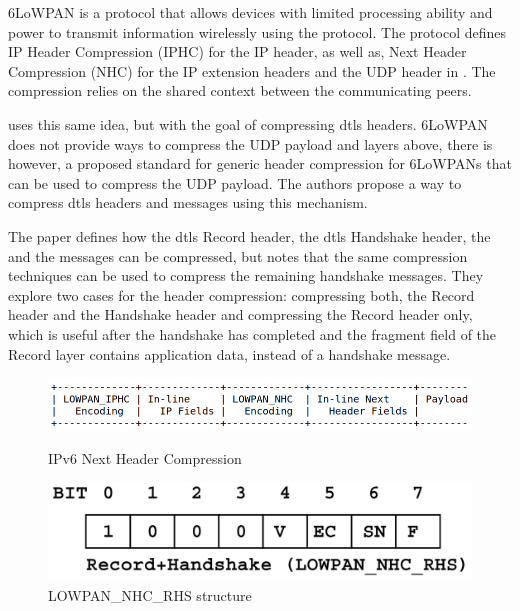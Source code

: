 \documentclass{llncs}
\begin{document}
6LoWPAN\cite{RFC4944} is a protocol that allows devices with limited processing
ability and power to transmit information wirelessly using the 
protocol. The protocol defines IP Header Compression (IPHC) for the IP header, as well as,
Next Header Compression (NHC) for the IP extension headers and the UDP header in \cite{RFC6282}.
The compression relies on the shared context between the communicating peers.

\cite{6LoWPANC53:online} uses this same idea, but with the goal of compressing \gls{dtls} headers.
6LoWPAN does not provide ways to compress the UDP payload and layers above, there
is however, a proposed standard\cite{RFC7400} for generic header compression
for 6LoWPANs that can be used to compress the UDP payload. The authors propose
a way to compress \gls{dtls} headers and messages using this mechanism.

The paper \cite{6LoWPANC53:online} defines how the \gls{dtls} Record header, the \gls{dtls} Handshake header,
the  and the  messages can be compressed, but notes that
the same compression techniques can be used to compress the remaining handshake
messages. They explore two cases for the header compression: compressing both,
the Record header and the Handshake header and compressing the Record header only,
which is useful after the handshake has completed and the fragment field of the
Record layer contains application data, instead of a handshake message.

\begin{figure}
    \centering
    \begin{minipage}{0.5\textwidth}
        \centering
        \includegraphics[width=1.0\textwidth]{img/6lowpan-header.png} %
        \caption{\label{fig:6lowpan-header} IPv6 Next Header Compression}
    \end{minipage}\hfill
    \begin{minipage}{0.5\textwidth}
        \centering
        \includegraphics[width=1.0\textwidth]{img/6lowpan-ghc-rhs.png} %
        \caption{\label{fig:6lowpan-ghc-rhs} LOWPAN\_NHC\_RHS structure}
    \end{minipage}
\end{figure}
\end{document}
